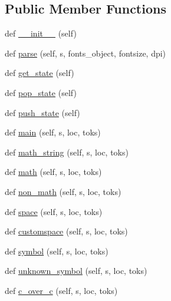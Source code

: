 \subsection*{Public Member Functions}
\begin{DoxyCompactItemize}
\item 
def \hyperlink{classmatplotlib_1_1__mathtext_1_1Parser_a5cf498317e985c1b4cf16544b1ba65f1}{\+\_\+\+\_\+init\+\_\+\+\_\+} (self)
\item 
def \hyperlink{classmatplotlib_1_1__mathtext_1_1Parser_a0efc32603aafe72e13e696c619e4cc11}{parse} (self, s, fonts\+\_\+object, fontsize, dpi)
\item 
def \hyperlink{classmatplotlib_1_1__mathtext_1_1Parser_a94b09851247b3c4c14c8676dc54a059e}{get\+\_\+state} (self)
\item 
def \hyperlink{classmatplotlib_1_1__mathtext_1_1Parser_a9d203b2d7d620d2105e1ecb8b7e893c4}{pop\+\_\+state} (self)
\item 
def \hyperlink{classmatplotlib_1_1__mathtext_1_1Parser_ae2ddabfd870b3954924ff60d87bb401f}{push\+\_\+state} (self)
\item 
def \hyperlink{classmatplotlib_1_1__mathtext_1_1Parser_af73c9465e97b7e566f750a383aad6cc7}{main} (self, s, loc, toks)
\item 
def \hyperlink{classmatplotlib_1_1__mathtext_1_1Parser_a9cf601bdaf698108598abad71bdba8bd}{math\+\_\+string} (self, s, loc, toks)
\item 
def \hyperlink{classmatplotlib_1_1__mathtext_1_1Parser_accfa28ae3acaf09790fe8f0b39e05d03}{math} (self, s, loc, toks)
\item 
def \hyperlink{classmatplotlib_1_1__mathtext_1_1Parser_acf552ac7fbc43ebceaff2bd3ae8bbc96}{non\+\_\+math} (self, s, loc, toks)
\item 
def \hyperlink{classmatplotlib_1_1__mathtext_1_1Parser_a9a280946ad09d992f397648d1571f406}{space} (self, s, loc, toks)
\item 
def \hyperlink{classmatplotlib_1_1__mathtext_1_1Parser_ab678f3e1e64a79b69f4721b2b9354365}{customspace} (self, s, loc, toks)
\item 
def \hyperlink{classmatplotlib_1_1__mathtext_1_1Parser_a8bf398e32270eb62b58dc669fb32449d}{symbol} (self, s, loc, toks)
\item 
def \hyperlink{classmatplotlib_1_1__mathtext_1_1Parser_ae75cba3fd593c17675dded4679a99a6d}{unknown\+\_\+symbol} (self, s, loc, toks)
\item 
def \hyperlink{classmatplotlib_1_1__mathtext_1_1Parser_a8aa69f67ddf0f622075de258e7a7a29d}{c\+\_\+over\+\_\+c} (self, s, loc, toks)

\end{DoxyCompactItemize}
